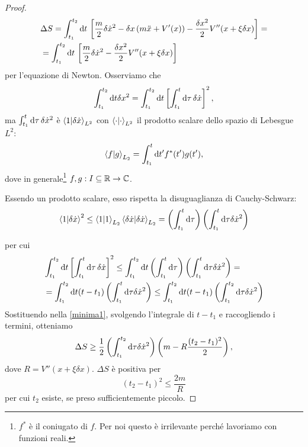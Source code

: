 \begin{proof}
        \begin{equation}
        \begin{aligned}
            &\Delta S = \int_{t_1}^{t_2} \mathrm{d} t\,\left[\frac{m}{2}\delta \dot{x}^2-\delta x\left(m\ddot{x}+V'(x)\right)-\frac{\delta x^2}{2}V''(x+\xi\delta x)\right]=\\
            &=\int_{t_1}^{t_2} \mathrm{d} t\,\left[\frac{m}{2}\delta \dot{x}^2-\frac{\delta x^2}{2}V''(x+\xi\delta x)\right]
            \label{minima1}
            \end{aligned}
        \end{equation}
        per l'equazione di Newton. Osserviamo che
        \begin{equation}
            \int_{t_1}^{t_2} \mathrm{d} t \delta{x}^2 = \int_{t_1}^{t_2} \mathrm{d} t\left[\int_{t_1}^t\mathrm{d} \tau\,\delta\dot{x}\right]^2,
        \end{equation}
        ma $\int_{t_1}^t\mathrm{d} \tau\,\delta\dot{x}^2$ è $\braket{1|\delta \dot{x}}_{L^2}$ con $\braket{\cdot|\cdot}_{L^2}$ il prodotto scalare dello spazio di Lebesgue $L^2$:
        \begin{equation}
            \braket{f|g}_{L_2} = \int_{t_1}^t \mathrm{d} t' f^*(t')g(t'),
        \end{equation}
        dove in generale\footnote{$f^*$ è il coniugato di $f$. Per noi questo è irrilevante perché lavoriamo con funzioni reali.} $f,g:I\subseteq \mathbb{R}\to \mathbb{C}$.

        Essendo un prodotto scalare, esso rispetta la disuguaglianza di Cauchy-Schwarz:
        \begin{equation}
            \braket{1|\delta\dot{x}}^2\leq \braket{1|1}_{L_2}\braket{\delta\dot{x}|\delta\dot{x}}_{L_2} = \left(\int_{t_1}^t \mathrm{d} \tau\right)\left(\int_{t_1}^t\mathrm{d} \tau \delta \dot{x}^2\right)
        \end{equation}

        per cui
        \begin{equation}
        \begin{aligned}
            &\int_{t_1}^{t_2} \mathrm{d} t\left[\int_{t_1}^t\mathrm{d} \tau\,\delta\dot{x}\right]^2\leq \int_{t_1}^{t_2} \mathrm{d} t\left(\int_{t_1}^t \mathrm{d} \tau\right)\left(\int_{t_1}^t\mathrm{d} \tau \delta \dot{x}^2\right) =\\ &=\int_{t_1}^{t_2} \mathrm{d} t(t-t_1)\left(\int_{t_1}^t\mathrm{d} \tau \delta \dot{x}^2\right)\leq \int_{t_1}^{t_2} \mathrm{d} t(t-t_1)\left(\int_{t_1}^{t_2}\mathrm{d} \tau \delta \dot{x}^2\right)
            \end{aligned}
        \end{equation}
        Sostituendo nella \eqref{minima1}, svolgendo l'integrale di $t-t_1$ e raccogliendo i termini, otteniamo
        \begin{equation}
            \Delta S \geq \frac{1}{2}\left(\int_{t_1}^{t_2}\mathrm{d} \tau \delta \dot{x}^2\right)\left(m-R\frac{(t_2-t_1)^2}{2}\right),
        \end{equation}
        dove $R=V''(x+\xi\delta x)$. $\Delta S$ è positiva per
        \begin{equation}
            (t_2-t_1)^2 \leq \frac{2m}{R}
        \end{equation}
        per cui $t_2$ esiste, se preso sufficientemente piccolo.
    \end{proof}

